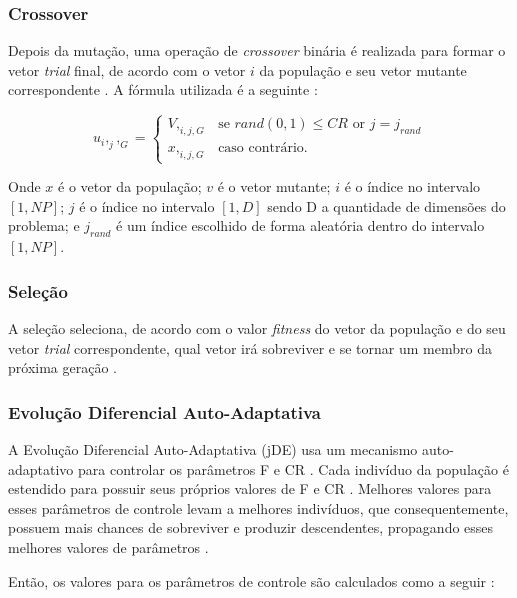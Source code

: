 \subsubsection{Crossover}

Depois da mutação, uma operação de \textit{crossover} binária é realizada para formar o vetor \textit{trial} final, de acordo com o vetor $i$ da população e seu vetor mutante correspondente \cite{brest}. A fórmula utilizada é a seguinte \cite{brest}:

\begin{equation}
u_i,_j,_G = 
\begin{cases}
    V,_{i,j,G}    & \text{se $rand(0, 1) \leq CR$ or $j = j_{rand}$}\\
    x,_{i,j,G} & \text{caso contrário.}
\end{cases}
\end{equation}

Onde $x$ é o vetor da população; $v$ é o vetor mutante; $i$ é o índice no intervalo $[1, NP]$; $j$ é o índice no intervalo $[1, D]$ sendo D a quantidade de dimensões do problema; e $j_{rand}$ é um índice escolhido de forma aleatória dentro do intervalo $[1, NP]$. 

\subsubsection{Seleção}

A seleção seleciona, de acordo com o valor \textit{fitness} do vetor da população e do seu vetor \textit{trial} correspondente, qual vetor irá sobreviver e se tornar um membro da próxima geração \cite{brest}.

\subsubsection{Evolução Diferencial Auto-Adaptativa}

A Evolução Diferencial Auto-Adaptativa (jDE) usa um mecanismo auto-adaptativo para controlar os parâmetros F e CR \cite{brest}. Cada indivíduo da população é estendido para possuir seus próprios valores de F e CR \cite{brest}. Melhores valores para esses parâmetros de controle levam a melhores indivíduos, que consequentemente, possuem mais chances de sobreviver e produzir descendentes, propagando esses melhores valores de parâmetros \cite{brest}.

Então, os valores para os parâmetros de controle são calculados como a seguir \cite{brest}:

